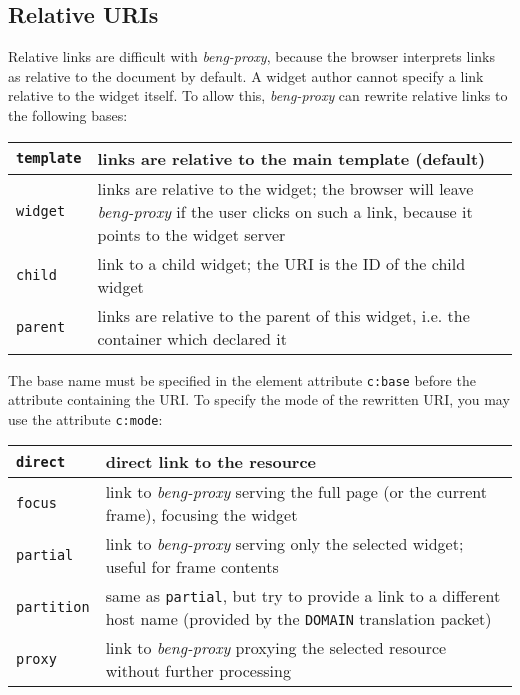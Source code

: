 \documentclass[a4paper,12pt]{article}
\begin{document}
\subsection{Relative URIs}

Relative links are difficult with \emph{beng-proxy}, because the
browser interprets links as relative to the document by default.  A
widget author cannot specify a link relative to the widget itself.  To
allow this, \emph{beng-proxy} can rewrite relative links to the
following bases:

\begin{tabular}{|l|p{10cm}|}
\hline

\texttt{template} & links are relative to the main template (default)
\\

\hline

\texttt{widget} & links are relative to the widget; the browser will
leave \emph{beng-proxy} if the user clicks on such a link, because it
points to the widget server \\

\hline

\texttt{child} & link to a child widget; the URI is the ID of the
child widget \\

\hline

\texttt{parent} & links are relative to the parent of this widget,
i.e. the container which declared it \\

\hline
\end{tabular}

The base name must be specified in the element attribute
\texttt{c:base} before the attribute containing the URI.  To specify
the mode of the rewritten URI, you may use the attribute
\texttt{c:mode}:

\begin{tabular}{|l|p{10cm}|}
\hline

\texttt{direct} & direct link to the resource \\

\hline

\texttt{focus} & link to \emph{beng-proxy} serving the full page (or
the current frame), focusing the widget \\

\hline

\texttt{partial} & link to \emph{beng-proxy} serving only the selected
widget; useful for frame contents \\

\hline

\texttt{partition} & same as \texttt{partial}, but try to provide a
link to a different host name (provided by the \texttt{DOMAIN}
translation packet) \\

\hline

\texttt{proxy} & link to \emph{beng-proxy} proxying the selected
resource without further processing \\

\hline
\end{tabular}
\end{document}
